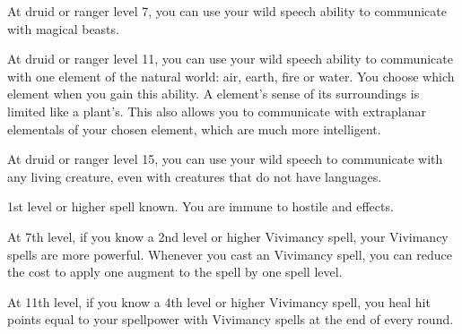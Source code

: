     At druid or ranger level 7, you can use your wild speech ability to communicate with magical beasts.

    At druid or ranger level 11, you can use your wild speech ability to communicate with one element of the natural world: air, earth, fire or water.
    You choose which element when you gain this ability.
    A element's sense of its surroundings is limited like a plant's.
    This also allows you to communicate with extraplanar elementals of your chosen element, which are much more intelligent.

    At druid or ranger level 15, you can use your wild speech to communicate with any living creature, even with creatures that do not have languages.

    \featpres 1st level or higher  spell known.
    \featben You are immune to hostile  and  effects.

    At 7th level, if you know a 2nd level or higher Vivimancy spell, your Vivimancy spells are more powerful.
    Whenever you cast an Vivimancy spell, you can reduce the cost to apply one augment to the spell by one spell level.

    At 11th level, if you know a 4th level or higher Vivimancy spell, you heal hit points equal to your spellpower with Vivimancy spells at the end of every round.

